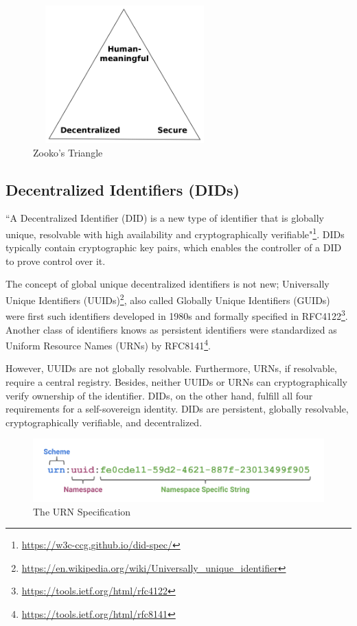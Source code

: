 		\begin{figure}[h]
			\centering
			\includegraphics[width=200pt, height=150pt]{figures/zooko-triangle}
			\caption{\label{fig:zooko-triangle} Zooko's Triangle\protect\footnotemark}
		\end{figure}
	
	\subsection{Decentralized Identifiers (DIDs)}
		``A Decentralized Identifier (DID) is a new type of identifier that is globally unique, resolvable with high availability and cryptographically verifiable"\footnote{\url{https://w3c-ccg.github.io/did-spec/}}. DIDs typically contain cryptographic key pairs, which enables the controller of a DID to prove control over it.
		
		The concept of global unique decentralized identifiers is not new; Universally Unique Identifiers (UUIDs)\footnote{\url{https://en.wikipedia.org/wiki/Universally_unique_identifier}}, also called Globally Unique Identifiers (GUIDs) were first such identifiers developed in 1980s and formally specified in RFC4122\footnote{\url{https://tools.ietf.org/html/rfc4122}}. Another class of identifiers knows as persistent identifiers were standardized as Uniform Resource Names (URNs) by RFC8141\footnote{\url{https://tools.ietf.org/html/rfc8141}}.
		
		However, UUIDs are not globally resolvable. Furthermore, URNs, if resolvable, require a central registry. Besides, neither UUIDs or URNs can cryptographically verify ownership of the identifier. DIDs, on the other hand, fulfill all four requirements for a self-sovereign identity\cite{smith2016identity}. DIDs are persistent, globally resolvable, cryptographically verifiable, and decentralized.
		
		\begin{figure}[h]
			\includegraphics[width=\linewidth]{figures/urn-format}
			\caption{\label{fig:urn-format} The URN Specification}
		\end{figure}
		
